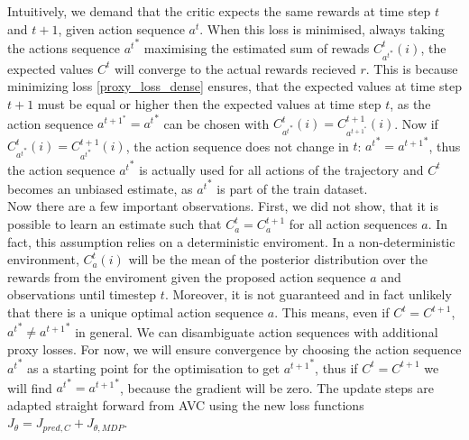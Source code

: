 Intuitively, we demand that the critic expects the same rewards at time step $t$ and $t+1$, given action sequence $a^t$. When this loss is minimised, always taking the actions sequence ${a^t}^*$ maximising the estimated sum of 
rewads $C_{{a^t}^*}^t(i)$, 
the expected values $C^t$ will converge to the actual rewards recieved $r$. This is because minimizing loss \ref{proxy_loss_dense} ensures, that the expected 
values at time step $t+1$ must be equal or higher then the expected values at time step $t$, as the action sequence $a^{t+1}^* = {a^t}^*$ can be chosen with 
$C_{{a^t}^*}^t(i) = C_{a^{t+1}^*}^{t+1}(i)$. Now if $C_{{a^t}^*}^t(i) = C_{{a^t}^*}^{t+1}(i)$, the action sequence does not change in $t$: ${a^t}^* = {a^{t+1}}^*$, thus the action 
sequence ${a^t}^*$ is actually used for all actions of the trajectory and $C^t$ becomes an unbiased estimate, as ${a^t}^*$ is part of the train dataset. \\

Now there are a few important observations. First, we did not show, that it is possible to learn an estimate such that $C_a^t = C_a^{t+1}$ for all action sequences $a$. 
In fact, this assumption relies on a deterministic 
enviroment. In a non-deterministic environment, $C_a^t(i)$ will be the mean of the posterior distribution over the rewards from the enviroment given the proposed action sequence $a$ 
and observations until timestep $t$. 
Moreover, it is not guaranteed and in fact unlikely that there is a unique optimal action sequence $a$. This means, even if $C^t = C^{t+1}$, ${a^t}^* \neq {a^{t+1}}^*$ in general. We can 
disambiguate action sequences with additional proxy losses. 
For now, we will ensure convergence by choosing the action sequence ${a^t}^*$ as a starting point for the optimisation to get ${a^{t+1}}^*$, thus if $C^t = C^{t+1}$ we will find 
${a^t}^* = {a^{t+1}}^*$, because the gradient will be zero. 
The update 
steps are adapted straight forward from AVC using the new loss functions $J_{\theta} = J_{pred, C} + J_{\theta, MDP}$. 

